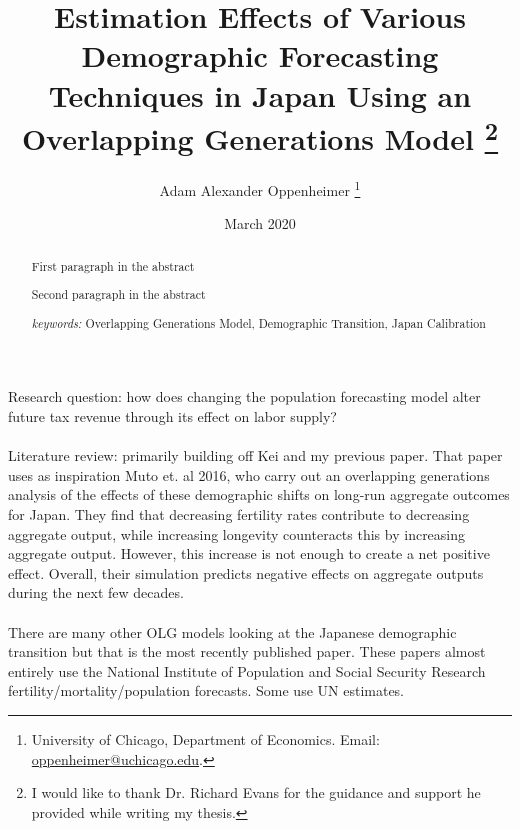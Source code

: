 \documentclass[10pt]{article}
\renewcommand{\thesection}{\arabic{section}}
\numberwithin{equation}{subsection}
\renewcommand{\section}[2][]{\oldsection[#1]{#2}\index{#1}\label{sec:\thesection}}
\begin{document}
\begin{titlepage}
\title{Estimation Effects of Various Demographic Forecasting Techniques in Japan Using an Overlapping Generations Model 
         \thanks{I would like to thank Dr. Richard Evans for the guidance and support he provided while writing my thesis.}
      }
\author{
   Adam Alexander Oppenheimer
   \footnote{University of Chicago,
      Department of Economics. Email:
      \href{mailto:oppenheimer@uchicago.edu}
      {oppenheimer@uchicago.edu}.
   }
}
\date{March 2020 \\
   \scriptsize{}}
\maketitle
\vspace{-9mm}
\begin{abstract}
\small{First paragraph in the abstract
\par Second paragraph in the abstract

\vspace{3mm}

\noindent\textit{keywords:}\:
   Overlapping Generations Model,
   Demographic Transition,
   Japan Calibration

\vspace{3mm}

}

\end{abstract}
\thispagestyle{empty}
\end{titlepage}


\section{Introduction}

Research question: how does changing the population forecasting model alter future tax revenue through its effect on labor supply?
\\\\
Literature review: primarily building off Kei and my previous paper. That paper uses as inspiration Muto et. al 2016, who carry out an overlapping generations analysis of the effects of these demographic shifts on long-run aggregate outcomes for Japan. They find that decreasing fertility rates contribute to decreasing aggregate output, while increasing longevity counteracts this by increasing aggregate output.  However, this increase is not enough to create a net positive effect. Overall, their simulation predicts negative effects on aggregate outputs during the next few decades.
\\\\
There are many other OLG models looking at the Japanese demographic transition but that is the most recently published paper. These papers almost entirely use the National Institute of Population and Social Security Research fertility/mortality/population forecasts. Some use UN estimates.
\end{document}
